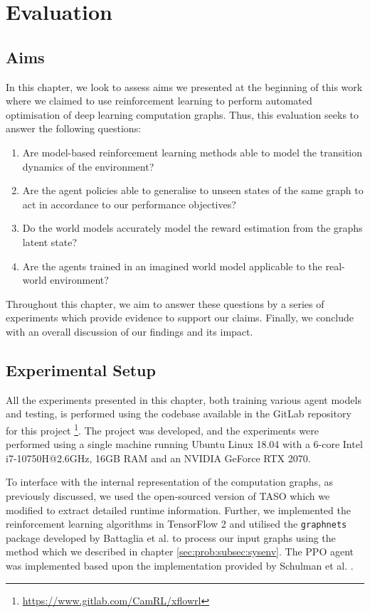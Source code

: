 \chapter{Evaluation}

\section{Aims}

In this chapter, we look to assess aims we presented at the beginning of this work where we claimed to use reinforcement learning to perform automated optimisation of deep learning computation graphs. Thus, this evaluation seeks to answer the following questions:

\begin{enumerate}
  \item Are model-based reinforcement learning methods able to model the transition dynamics of the environment?
  \item Are the agent policies able to generalise to unseen states of the same graph to act in accordance to our performance objectives?
  \item Do the world models accurately model the reward estimation from the graphs latent state?
  \item Are the agents trained in an imagined world model applicable to the real-world environment?
\end{enumerate}

Throughout this chapter, we aim to answer these questions by a series of experiments which provide evidence to support our claims. Finally, we conclude with an overall discussion of our findings and its impact.

\section{Experimental Setup}

All the experiments presented in this chapter, both training various agent models and testing, is performed using the codebase available in the GitLab repository for this project \footnote{\url{https://www.gitlab.com/CamRL/xflowrl}}. The project was developed, and the experiments were performed using a single machine running Ubuntu Linux 18.04 with a 6-core Intel i7-10750H@2.6GHz, 16GB RAM and an NVIDIA GeForce RTX 2070.

To interface with the internal representation of the computation graphs, as previously discussed, we used the open-sourced version of TASO \cite{jia2019taso} which we modified to extract detailed runtime information. Further, we implemented the reinforcement learning algorithms in TensorFlow 2 \cite{tensorflow2015-whitepaper} and utilised the \texttt{graph\textunderscore nets} package developed by Battaglia et al. \cite{battaglia2018relational} to process our input graphs using the method which we described in chapter \ref{sec:prob:subsec:sysenv}. The PPO agent was implemented based upon the implementation provided by Schulman et al. \cite{schulman2017proximal}.

